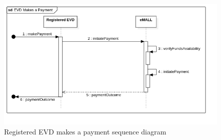 \begin{center}
    \begin{figure} [H]
        \begin{center}
            \includegraphics[width=0.9\linewidth]{Images/SequenceDiagrams/evd_makes_a_payment}
            \caption{Registered EVD makes a payment sequence diagram}
            \label{fig: evd_pays_seq_diag}
        \end{center}
    \end{figure}
\end{center}

